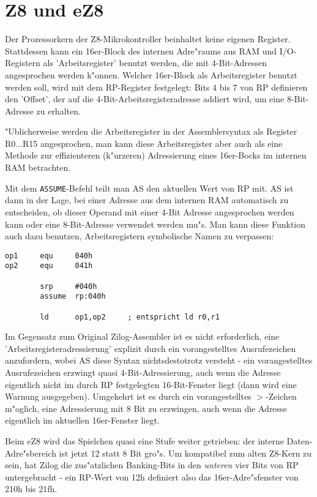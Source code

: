 \documentclass[12pt,a4paper,twoside]{report}
\newcommand{\tty}[1]{{\tt #1}}
\begin{document}

\section{Z8 und eZ8}
\label{Z8Spec}

Der Prozessorkern der Z8-Mikrokontroller beinhaltet keine eigenen
Register.  Stattdessen kann ein 16er-Block des internen Adre"raums
aus RAM und I/O-Registern als 'Arbeitsregister' benutzt werden, die
mit 4-Bit-Adressen angesprochen werden k"onnen.  Welcher 16er-Block
als Arbeitsregister benutzt werden soll, wird mit dem RP-Register
festgelegt: Bits 4 bis 7 von RP definieren den 'Offset', der auf die
4-Bit-Arbeitsregisteradresse addiert wird, um eine 8-Bit-Adresse zu
erhalten.

"Ublicherweise werden die Arbeitsregister in der Assemblersyntax als
Register R0...R15 angesprochen, man kann diese Arbeitsregister aber
auch als eine Methode zur effizienteren (k"urzeren) Adressierung eines
16er-Bocks im internen RAM betrachten.

Mit dem \tty{ASSUME}-Befehl teilt man AS den aktuellen Wert von RP mit.  AS
ist dann in der Lage, bei einer Adresse aus dem internen RAM
automatisch zu entscheiden, ob dieser Operand mit einer 4-Bit Adresse
angesprochen werden kann oder eine 8-Bit-Adresse verwendet werden
mu"s.  Man kann diese Funktion auch dazu benutzen, Arbeitsregistern
symbolische Namen zu verpassen:
\begin{verbatim}
op1     equ     040h
op2     equ     041h

        srp     #040h
        assume  rp:040h

        ld      op1,op2		; entspricht ld r0,r1
\end{verbatim}
Im Gegensatz zum Original Zilog-Assembler ist es nicht erforderlich,
eine 'Arbeitsregisteradressierung' explizit durch ein vorangestelltes
Ausrufezeichen anzufordern, wobei AS diese Syntax nichtsdestotrotz
versteht - ein vorangestelltes Ausrufezeichen erzwingt quasi
4-Bit-Adressierung, auch wenn die Adresse eigentlich nicht im durch
RP festgelegten 16-Bit-Fenster liegt (dann wird eine Warnung
ausgegeben).  Umgekehrt ist es durch ein vorangestelltes $>$-Zeichen
m"oglich, eine Adressierung mit 8 Bit zu erzwingen, auch wenn die
Adresse eigentlich im aktuellen 16er-Fenster liegt.

Beim eZ8 wird das Spielchen quasi eine Stufe weiter getrieben: der
interne Daten-Adre"sbereich ist jetzt 12 statt 8 Bit gro"s.  Um
kompatibel zum alten Z8-Kern zu sein, hat Zilog die zus"atzlichen
Banking-Bits in den {\em unteren} vier Bits von RP untergebracht -
ein RP-Wert von 12h definiert also das 16er-Adre"sfenster von 210h
bis 21fh.
\end{document}
